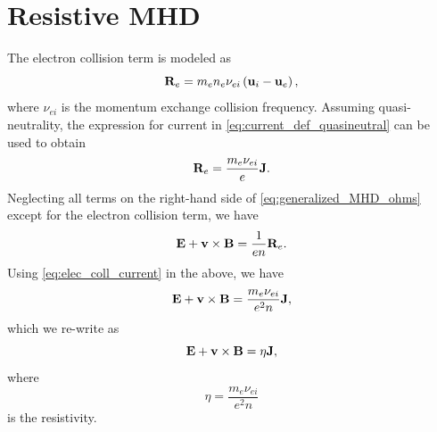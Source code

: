 \documentclass[a4paper,11pt]{report}
\begin{document}
\section{Resistive MHD}
The electron collision term is modeled as
\begin{equation}
    \mathbf{R}_e = m_e n_e \nu_{ei} \left ( \mathbf{u}_i - \mathbf{u}_e \right ),
\end{equation}
where $\nu_{ei}$ is the momentum exchange collision frequency. Assuming quasi-neutrality, the expression for current in \cref{eq:current_def_quasineutral} can be used to obtain
\begin{equation}
\label{eq:elec_coll_current}
    \mathbf{R}_e = \frac{m_e \nu_{ei}}{e} \mathbf{J}.
\end{equation}
Neglecting all terms on the right-hand side of \cref{eq:generalized_MHD_ohms} except for the electron collision term, we have
\begin{equation}
    \mathbf{E} + \mathbf{v} \times \mathbf{B} = \frac{1}{en} \mathbf{R}_e.
\end{equation}
Using \cref{eq:elec_coll_current} in the above, we have
\begin{equation}
    \mathbf{E} + \mathbf{v} \times \mathbf{B} = \frac{m_e \nu_{ei}}{e^2n} \mathbf{J},
\end{equation}
which we re-write as 
\begin{equation}
    \mathbf{E} + \mathbf{v} \times \mathbf{B} = \eta \mathbf{J},
\end{equation}
where
\begin{equation}
\label{eq:resistivity}
    \eta = \frac{m_e \nu_{ei}}{e^2 n}
\end{equation}
is the resistivity.

\end{document}
